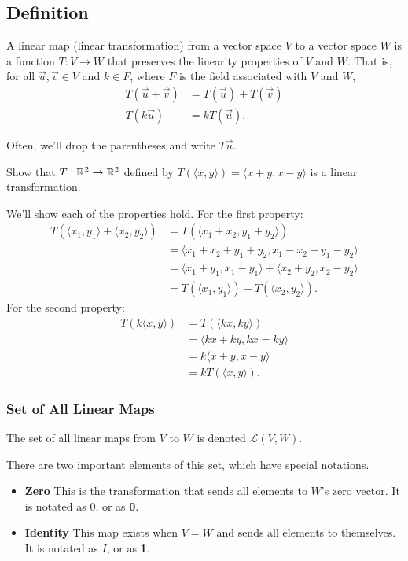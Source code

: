 \subsection{Definition}
\begin{definition}
	A linear map (linear transformation) from a vector space $V$ to a vector space $W$ is a function $T: V \to W$ that preserves the linearity properties of $V$ and $W$.
	That is, for all $\vec{u}, \vec{v} \in V$ and $k \in F$, where $F$ is the field associated with $V$ and $W$,
	\begin{align*}
		T(\vec{u} + \vec{v}) &= T(\vec{u}) + T(\vec{v}) \\
		T(k\vec{u}) &= k T(\vec{u}).
	\end{align*}
\end{definition}
Often, we'll drop the parentheses and write $T\vec{u}$.

\begin{example}
	Show that $T: \mathbb{R}^2 \to \mathbb{R}^2$ defined by $T(\langle x, y \rangle) = \langle x+y, x-y \rangle$ is a linear transformation.
\end{example}
\begin{answer}
	We'll show each of the properties hold.
	For the first property:
	\begin{align*}
		T(\langle x_1, y_1 \rangle + \langle x_2, y_2 \rangle) &= T(\langle x_1+x_2, y_1+y_2 \rangle) \\
		&= \langle x_1+x_2+y_1+y_2, x_1-x_2+y_1-y_2 \rangle \\
		&= \langle x_1+y_1, x_1-y_1 \rangle + \langle x_2+y_2, x_2-y_2 \rangle \\
		&= T(\langle x_1, y_1 \rangle) + T(\langle x_2, y_2 \rangle).
	\end{align*}
	For the second property:
	\begin{align*}
		T(k \langle x, y \rangle) &= T(\langle kx, ky \rangle) \\
		&= \langle kx + ky, kx = ky \rangle \\
		&= k \langle x+y, x-y \rangle \\
		&= k T(\langle x, y \rangle).
	\end{align*}
\end{answer}

\subsubsection{Set of All Linear Maps}
\begin{definition}
	The set of all linear maps from $V$ to $W$ is denoted $\mathcal{L}(V,W)$.
\end{definition}

There are two important elements of this set, which have special notations.
\begin{itemize}
	\item \textbf{Zero}
	This is the transformation that sends all elements to $W$'s zero vector.
	It is notated as $0$, or as \textbf{0}.
	\item \textbf{Identity}
	This map exists when $V = W$ and sends all elements to themselves.
	It is notated as $I$, or as \textbf{1}.
\end{itemize}
